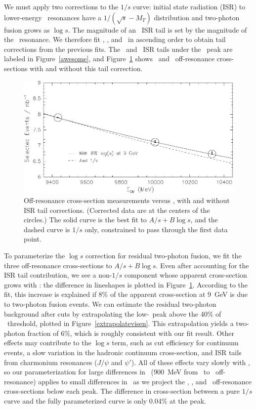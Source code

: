 \documentclass{cornell}
\begin{document}
We must apply two corrections to the $1/s$ curve: initial state
radiation (ISR) to lower-energy \ups\ resonances have a $1/(\sqrt{s} -
M_\Upsilon)$ distribution and two-photon fusion grows as $\log s$.
The magnitude of an \ups\ ISR tail is set by the magnitude of the
\ups\ resonance.  We therefore fit \us, \uss, and \usss\ in ascending
order to obtain tail corrections from the previous fits.  The \us\ and
\uss\ ISR tails under the \usss\ peak are labeled in Figure~\ref{awesome}, and Figure~\ref{logsfit} shows \uss\ and \usss\
off-resonance cross-sections with and without this tail correction.

\begin{figure}[p]
  \begin{center}
    \includegraphics[width=\linewidth]{plots/logsfit}
  \end{center}
  \caption{\label{logsfit} Off-resonance cross-section measurements
  versus \ecm, with and without ISR tail corrections.  (Corrected data
  are at the centers of the circles.)  The solid curve is the best fit
  to $A/s+B\log s$, and the dashed curve is $1/s$ only, constrained to
  pass through the first data point.}
\end{figure}

\label{pag:logs}
To parameterize the $\log s$ correction for residual two-photon
fusion, we fit the three off-resonance cross-sections to $A/s + B\log
s$.  Even after accounting for the ISR tail contribution, we see a
non-$1/s$ component whose apparent cross-section grows with \ecm: the
difference in lineshapes is plotted in Figure~\ref{logsfit}.
According to the fit, this increase is explained if 8\% of the
apparent cross-section at 9~GeV is due to two-photon fusion events.
We can estimate the residual two-photon background after cuts by
extrapolating the low-\visen\ peak above the 40\% of \ecm\ threshold,
plotted in Figure~\ref{extrapolatevisen}.  This extrapolation yields a
two-photon fraction of 6\%, which is roughly consistent with our fit
result.  Other effects may contribute to the $\log s$ term, such as
cut efficiency for continuum events, a slow variation in the hadronic
continuum cross-section, and ISR tails from charmonium resonances
($J/\psi$ and $\psi'$).  All of these effects vary slowly with \ecm,
so our parameterization for large differences in \ecm\ (900~MeV from
\us\ to \usss\ off-resonance) applies to small differences in \ecm\ as
we project the \us, \uss, and \usss\ off-resonance cross-sections
below each peak.  The difference in cross-section between a pure $1/s$
curve and the fully parameterized curve is only 0.04\% at the peak.
\end{document}
